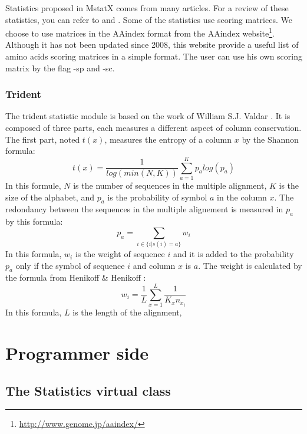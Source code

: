 \documentclass[12pt]{report}
\begin{document}
Statistics proposed in MstatX comes from many articles. For a review of these statistics, you can refer to  \cite{Valdar-2002} and  \cite{Johansson-2010}. Some of the statistics use scoring matrices. We choose to use matrices in the AAindex format \cite{Kawashima-2008} from the AAindex website\footnote{\url{http://www.genome.jp/aaindex/}}. Although it has not been updated since 2008, this website provide a useful list of amino acids scoring matrices in a simple format. The user can use his own scoring matrix by the flag -sp and -sc.

\subsubsection{Trident}
\label{trid_stat}
The trident statistic module is based on the work of William S.J. Valdar \cite{Valdar-2002}. 
It is composed of three parts, each measures a different aspect of column conservation.\\

The first part, noted $t(x)$, measures the entropy of a column $x$ by the Shannon formula:
\begin{equation}
 t(x) = \frac{1}{log(min(N,K))}\sum_{a=1}^{K}p_a log(p_a)
\end{equation}
In this formule, $N$ is the number of sequences in the multiple alignment, $K$ is the size of the alphabet, and $p_a$ is the probability of symbol $a$ in the column $x$. The redondancy between the sequences in the multiple alignement is measured in $p_a$ by this formula:
\begin{equation}
	p_a = \sum_{i \in \{i|s(i) = a\}} w_i
\end{equation}
In this formula, $w_i$ is the weight of sequence $i$ and it is added to the probability $p_a$ only if the symbol of sequence $i$ and column $x$ is $a$. The weight is calculated by the formula from Henikoff \& Henikoff \cite{Henikoff-1994}:
\begin{equation}
	w_i = \frac{1}{L} \sum_{x=1}^{L}\frac{1}{K_x n_{x_i}}
\end{equation}
In this formula, $L$ is the length of the alignment, 

\newpage
\section{Programmer side}
\label{prog_sec}

\subsection{The Statistics virtual class}
\label{cla_sec}
\end{document}
